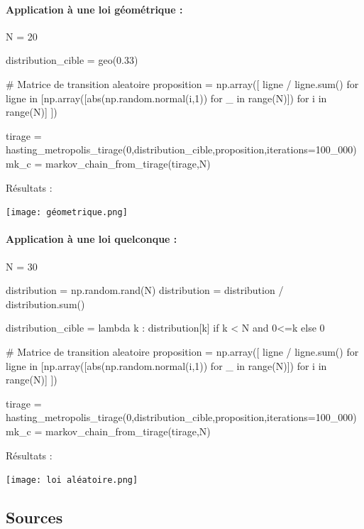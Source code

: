 \documentclass{article}
\begin{document}
\newpage
\paragraph{Application à une loi géométrique :}
\begin{center}
\begin{python}
N = 20

distribution_cible = geo(0.33)

# Matrice de transition aleatoire
proposition = np.array([ ligne / ligne.sum()
    for ligne in [np.array([abs(np.random.normal(i,1)) for _ in range(N)]) for i in range(N)]
])

tirage = hasting_metropolis_tirage(0,distribution_cible,proposition,iterations=100_000)
mk_c = markov_chain_from_tirage(tirage,N)
\end{python}
\end{center}
Résultats :

\texttt{[image: géometrique.png]}

\newpage
\paragraph{Application à une loi quelconque :}
\begin{center}
\begin{python}
N = 30

distribution = np.random.rand(N)
distribution = distribution / distribution.sum()

distribution_cible = lambda k : distribution[k] if k < N and 0<=k else 0

# Matrice de transition aleatoire
proposition = np.array([ ligne / ligne.sum()
    for ligne in [np.array([abs(np.random.normal(i,1)) for _ in range(N)]) for i in range(N)]
])

tirage = hasting_metropolis_tirage(0,distribution_cible,proposition,iterations=100_000)
mk_c = markov_chain_from_tirage(tirage,N)
\end{python}
\end{center}
Résultats :

\texttt{[image: loi aléatoire.png]}


\newpage
\subsection{Sources}
\end{document}
